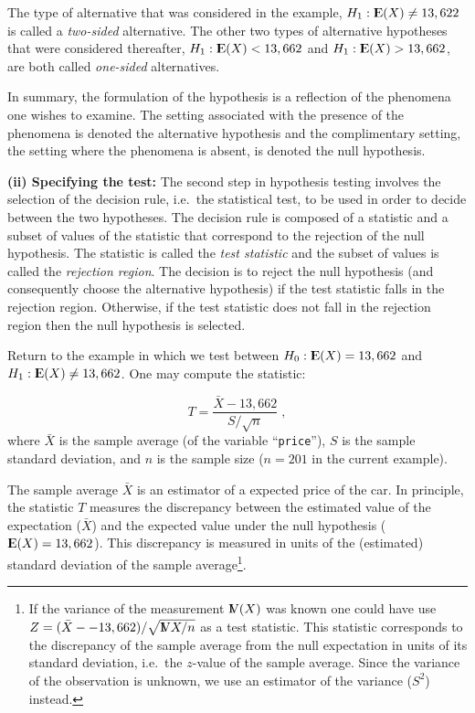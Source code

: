 \documentclass[]{krantz}
\newcommand{\Expec}{{\rm I\kern-.3em E}}
\newcommand{\Var}{{\rm I\kern-.3em V}}
\theoremstyle{definition}
\theoremstyle{definition}
\theoremstyle{definition}
\theoremstyle{remark}
\begin{document}
The type of alternative that was considered in the example,
\(H_1: \Expec(X) \not = 13,622\) is called a \emph{two-sided}
alternative. The other two types of alternative hypotheses that were
considered thereafter, \(H_1: \Expec(X) < 13,662\) and
\(H_1: \Expec(X) > 13,662\), are both called \emph{one-sided}
alternatives.

In summary, the formulation of the hypothesis is a reflection of the
phenomena one wishes to examine. The setting associated with the
presence of the phenomena is denoted the alternative hypothesis and the
complimentary setting, the setting where the phenomena is absent, is
denoted the null hypothesis.

{\textbf{(ii) Specifying the test:}} The second step in hypothesis
testing involves the selection of the decision rule, i.e.~the
statistical test, to be used in order to decide between the two
hypotheses. The decision rule is composed of a statistic and a subset of
values of the statistic that correspond to the rejection of the null
hypothesis. The statistic is called the \emph{test statistic} and the
subset of values is called the \emph{rejection region}. The decision is
to reject the null hypothesis (and consequently choose the alternative
hypothesis) if the test statistic falls in the rejection region.
Otherwise, if the test statistic does not fall in the rejection region
then the null hypothesis is selected.

Return to the example in which we test between
\(H_0:\Expec(X) = 13,662\) and \(H_1:\Expec(X) \not= 13,662\). One may
compute the statistic:

\[T = \frac{\bar X - 13,662}{S/\sqrt{n}}\;,\] where \(\bar X\) is the
sample average (of the variable ``\texttt{price}''), \(S\) is the sample
standard deviation, and \(n\) is the sample size (\(n = 201\) in the
current example).

The sample average \(\bar X\) is an estimator of a expected price of the
car. In principle, the statistic \(T\) measures the discrepancy between
the estimated value of the expectation (\(\bar X\)) and the expected
value under the null hypothesis (\(\Expec(X) = 13,662\)). This
discrepancy is measured in units of the (estimated) standard deviation
of the sample average\footnote{If the variance of the measurement
  \(\Var(X)\) was known one could have use
  \(Z = (\bar X- - 13,662)/\sqrt{\Var{X}/n}\) as a test statistic. This
  statistic corresponds to the discrepancy of the sample average from
  the null expectation in units of its standard deviation, i.e.~the
  \(z\)-value of the sample average. Since the variance of the
  observation is unknown, we use an estimator of the variance (\(S^2\))
  instead.}.
\end{document}

